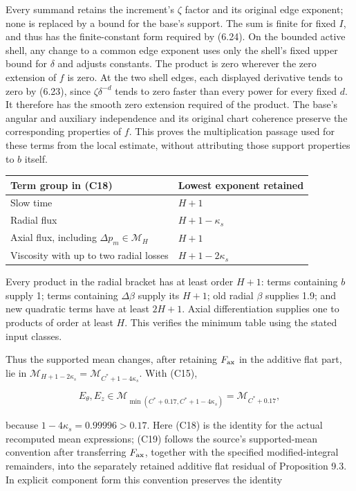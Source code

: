 \documentclass[10pt,a4paper]{article}
\newcounter{none}
\begin{document}
Every summand retains the increment's \(\zeta\) factor and its original edge exponent; none is replaced by a bound for the base's support. The sum is finite for fixed \(I\), and thus has the finite-constant form required by (6.24). On the bounded active shell, any change to a common edge exponent uses only the shell's fixed upper bound for \(\delta\) and adjusts constants. The product is zero wherever the zero extension of \(f\) is zero. At the two shell edges, each displayed derivative tends to zero by (6.23), since \(\zeta\delta^{-d}\) tends to zero faster than every power for every fixed \(d\). It therefore has the smooth zero extension required of the product. The base's angular and auxiliary independence and its original chart coherence preserve the corresponding properties of \(f\). This proves the multiplication passage used for these terms from the local estimate, without attributing those support properties to \(b\) itself.

{\def\LTcaptype{none} %
\begin{longtable}[]{@{}ll@{}}
\toprule\noalign{}
Term group in (C18) & Lowest exponent retained \\
\midrule\noalign{}
\endhead
\bottomrule\noalign{}
\endlastfoot
Slow time & \(H+1\) \\
Radial flux & \(H+1-\kappa_s\) \\
Axial flux, including \(\Delta p_m\in\mathcal M_H\) & \(H+1\) \\
Viscosity with up to two radial losses & \(H+1-2\kappa_s\) \\
\end{longtable}
}

Every product in the radial bracket has at least order \(H+1\): terms containing \(b\) supply 1; terms containing \(\Delta\beta\) supply its \(H+1\); old radial \(\beta\) supplies 1.9; and new quadratic terms have at least \(2H+1\). Axial differentiation supplies one to products of order at least \(H\). This verifies the minimum table using the stated input classes.

Thus the supported mean changes, after retaining \(F_{\rm ax}\) in the additive flat part, lie in \(\mathcal M_{H+1-2\kappa_s}=\mathcal M_{C^*+1-4\kappa_s}\). With (C15),

\[
E_\theta,E_z\in\mathcal M_{\min(C^*+0.17,C^*+1-4\kappa_s)}
=\mathcal M_{C^*+0.17},
\tag{C19}
\]

because \(1-4\kappa_s=0.99996>0.17\). Here (C18) is the identity for the actual recomputed mean expressions; (C19) follows the source's supported-mean convention after transferring \(F_{\rm ax}\), together with the specified modified-integral remainders, into the separately retained additive flat residual of Proposition 9.3. In explicit component form this convention preserves the identity
\end{document}
